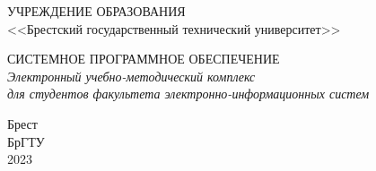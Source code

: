 \documentclass[12pt, a4paper]{book}%
\begin{document}
\large%
\begin{center}%
   УЧРЕЖДЕНИЕ ОБРАЗОВАНИЯ\\
   <<Брестский государственный технический университет>>
\end{center}%
\vspace{20mm}%
\begin{center}%
   \textbf{}%
   {\LARGE \color{red} СИСТЕМНОЕ ПРОГРАММНОЕ ОБЕСПЕЧЕНИЕ}\\[10mm]%
   {\it\Large Электронный учебно-методический комплекс }\\%
   {\it\Large для студентов факультета электронно-информационных систем}%
\end{center}%
\vspace{30mm}%
\begin{center}%
   Брест\\%
   БрГТУ\\%
   2023%
\end{center}%
\end{document}
